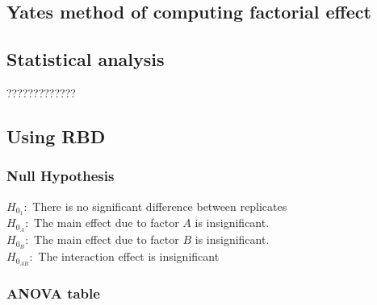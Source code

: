 \documentclass[oneside,11pt,pdftex]{book}%
\numberwithin{equation}{section}
\numberwithin{section}{chapter}
\numberwithin{equation}{chapter}
\begin{document}
\subsection{Yates method of computing factorial effect}


\begin{table}[]
	\centering
	\caption{Yate's method for $2^2$ factorial experiment}
	\label{tab:yatesmethodfor22}
\end{table}

\subsection{Statistical analysis}
?????????????
\subsection{Using RBD}
\subsubsection{Null Hypothesis}
$ H_{0_1}: $ There is no significant difference between replicates\\
$ H_{0_A}: $ The main effect due to factor $ A $ is insignificant.\\
$ H_{0_B} :$ The main effect due to factor $ B $ is insignificant.\\
$ H_{0_{AB}}: $ The interaction effect is insignificant
\subsubsection{ANOVA table}
\end{document}
